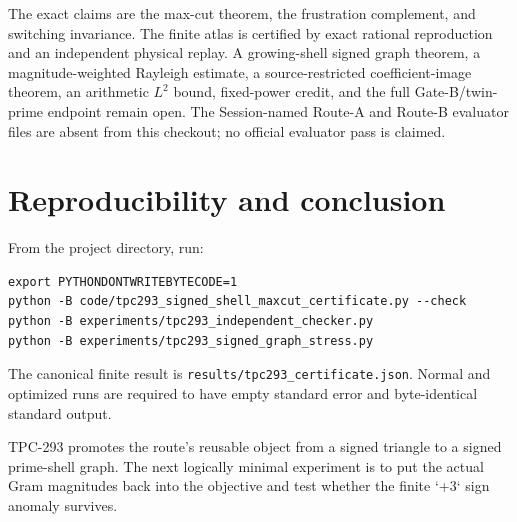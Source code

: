\documentclass[10pt]{article}
\begin{document}
The exact claims are the max-cut theorem, the frustration complement, and
switching invariance.  The finite atlas is certified by exact rational
reproduction and an independent physical replay.  A growing-shell signed
graph theorem, a magnitude-weighted Rayleigh estimate, a source-restricted
coefficient-image theorem, an arithmetic $L^2$ bound, fixed-power credit, and
the full Gate-B/twin-prime endpoint remain open.  The Session-named Route-A
and Route-B evaluator files are absent from this checkout; no official
evaluator pass is claimed.

\section{Reproducibility and conclusion}

From the project directory, run:
\begin{verbatim}
export PYTHONDONTWRITEBYTECODE=1
python -B code/tpc293_signed_shell_maxcut_certificate.py --check
python -B experiments/tpc293_independent_checker.py
python -B experiments/tpc293_signed_graph_stress.py
\end{verbatim}
The canonical finite result is
\texttt{results/tpc293\_certificate.json}.  Normal and optimized runs are
required to have empty standard error and byte-identical standard output.

TPC-293 promotes the route's reusable object from a signed triangle to a
signed prime-shell graph.  The next logically minimal experiment is to put
the actual Gram magnitudes back into the objective and test whether the
finite `+3` sign anomaly survives.



\end{document}
